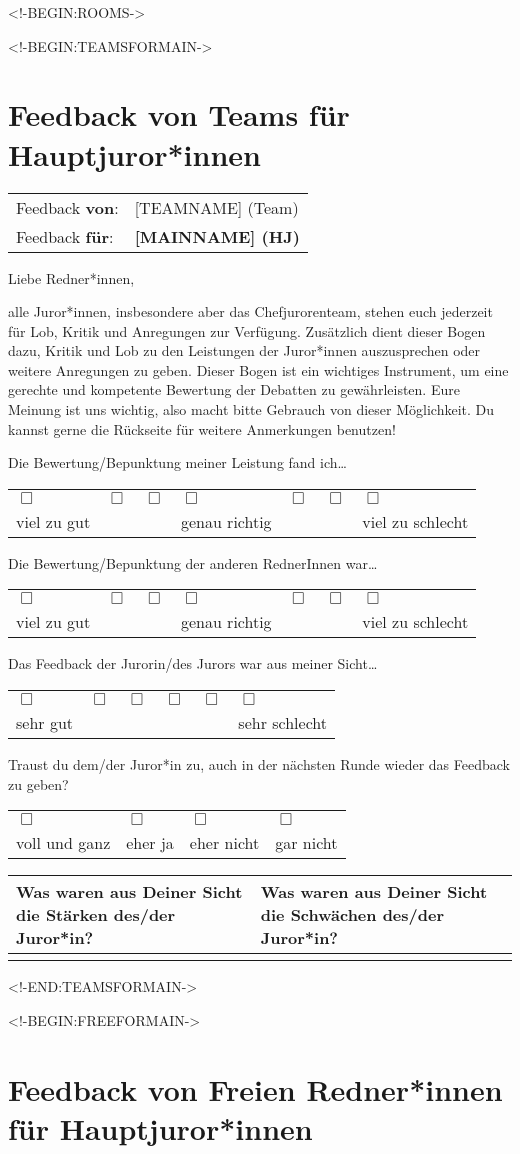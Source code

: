 \documentclass{scrartcl}
\newcommand{\questionsix}[3]{%
#3%

\medskip%

{%
  \centering%
  \begin{tabular}{>{\centering}p{0.13\textwidth}%
                  >{\centering}p{0.13\textwidth}%
                  >{\centering}p{0.13\textwidth}%
                  >{\centering}p{0.13\textwidth}%
                  >{\centering}p{0.13\textwidth}%
                  >{\centering\arraybackslash}p{0.13\textwidth}}%
    $\Box$ & $\Box$ & $\Box$ & $\Box$ & $\Box$ & $\Box$ \\%
    #1 & & & & & #2%
  \end{tabular}%
}%
}
\newcommand{\questionseven}[4]{%
#4%

\medskip%

{%
  \centering%
  \begin{tabular}{>{\centering}p{0.11\textwidth}%
                  >{\centering}p{0.11\textwidth}%
                  >{\centering}p{0.11\textwidth}%
                  >{\centering}p{0.11\textwidth}%
                  >{\centering}p{0.11\textwidth}%
                  >{\centering}p{0.11\textwidth}%
                  >{\centering\arraybackslash}p{0.11\textwidth}}%
    $\Box$ & $\Box$ & $\Box$ & $\Box$ & $\Box$ & $\Box$ & $\Box$ \\%
    #1 & & & #2 & & & #3%
  \end{tabular}%
}%
}
\newcommand{\questionfour}[1]{%
#1%

\medskip%

{%
  \centering%
  \begin{tabular}{>{\centering}p{0.23\textwidth}%
                  >{\centering}p{0.23\textwidth}%
                  >{\centering}p{0.23\textwidth}%
                  >{\centering\arraybackslash}p{0.23\textwidth}}%
    $\Box$ & $\Box$ & $\Box$ & $\Box$ \\%
    voll und ganz & eher ja & eher nicht & gar nicht %
  \end{tabular}%
}%
}
\newcommand{\strengthsandweaknesses}[1]{%
{%
  \centering%
  \begin{tabular}{|p{0.45\textwidth}|p{0.45\textwidth}|}%
    \hline%
    Was waren aus Deiner Sicht die Stärken des/der Juror*in? &%
    Was waren aus Deiner Sicht die Schwächen des/der Juror*in? \\%
    \hline%
    \bigskip & \\[#1]%
    \hline%
  \end{tabular}%
}%
}
\newcommand{\feedbackfromfor}[2]{%
\begin{tabular}{ll}%
  Feedback \textbf{von}: & #1 \\%
  Feedback \textbf{für}: & \textbf{#2}%
\end{tabular}%
}
\begin{document}
\setlength{\parindent}{0pt}

<!-BEGIN:ROOMS->

  \fancyhf{}

  <!-BEGIN:TEAMSFORMAIN->
    \section*{Feedback von Teams für Hauptjuror*innen}

    \feedbackfromfor{[TEAMNAME] (Team)}{[MAINNAME] (HJ)}

    \bigskip

    Liebe Redner*innen,

    \medskip

    alle Juror*innen, insbesondere aber das Chefjurorenteam, stehen euch
    jederzeit für Lob, Kritik und Anregungen zur Verfügung. Zusätzlich dient
    dieser Bogen dazu, Kritik und Lob zu den Leistungen der Juror*innen
    auszusprechen oder weitere Anregungen zu geben. Dieser Bogen ist ein
    wichtiges Instrument, um eine gerechte und kompetente Bewertung der
    Debatten zu gewährleisten. Eure Meinung ist uns wichtig, also macht bitte
    Gebrauch von dieser Möglichkeit. Du kannst gerne die Rückseite für weitere
    Anmerkungen benutzen!

    \medskip
    \hrulefill
    \medskip

    \questionseven{viel zu gut}{genau richtig}{viel zu schlecht}{
      Die Bewertung/Bepunktung meiner Leistung fand ich\dots
    }
    \medskip

    \questionseven{viel zu gut}{genau richtig}{viel zu schlecht}{
      Die Bewertung/Bepunktung der anderen RednerInnen war\dots
    }
    \medskip

    \questionsix{sehr gut}{sehr schlecht}{
      Das Feedback der Jurorin/des Jurors war aus meiner Sicht\dots
    }
    \medskip

    \questionfour{
      Traust du dem/der Juror*in zu, auch in der nächsten Runde wieder das
      Feedback zu geben?
    }
    \medskip

    \strengthsandweaknesses{6cm}

    \newpage
  <!-END:TEAMSFORMAIN->

  <!-BEGIN:FREEFORMAIN->
    \section*{Feedback von Freien Redner*innen für Hauptjuror*innen}
\end{document}

